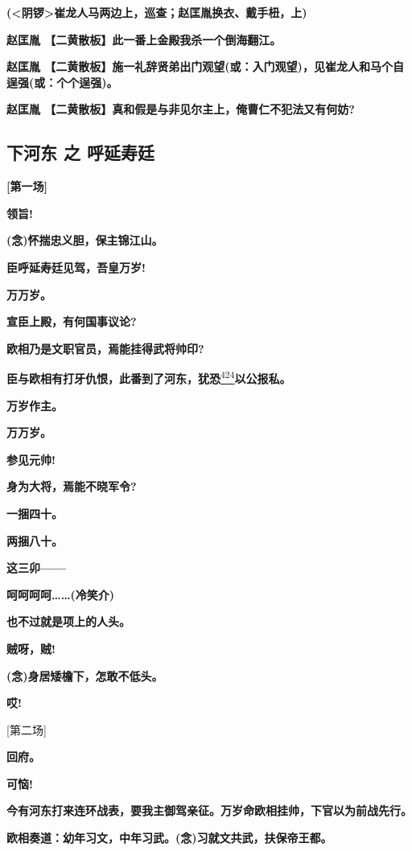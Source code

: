 \textbf{(\textless{}阴锣\textgreater{}崔龙人马两边上，巡查；赵匡胤换衣、戴手杻，上)}

\textbf{赵匡胤 【二黄散板】此一番上金殿我杀一个倒海翻江。}

\textbf{赵匡胤
【二黄散板】施一礼辞贤弟出门观望(或：入门观望)，见崔龙人和马个自逞强(或：个个逞强)。}

\textbf{赵匡胤 【二黄散板】真和假是与非见尔主上，俺曹仁不犯法又有何妨?}

\hypertarget{ux4e0bux6cb3ux4e1c-ux4e4b-ux547cux5ef6ux5bffux5ef7}{%
\subsection{下河东 之
呼延寿廷}\label{ux4e0bux6cb3ux4e1c-ux4e4b-ux547cux5ef6ux5bffux5ef7}}

\textbf{{[}第一场{]}}

\textbf{领旨!}

\textbf{(念)怀揣忠义胆，保主锦江山。}

\textbf{臣呼延寿廷见驾，吾皇万岁!}

\textbf{万万岁。}

\textbf{宣臣上殿，有何国事议论?}

\textbf{欧相乃是文职官员，焉能挂得武将帅印?}

\textbf{臣与欧相有打牙仇恨，此番到了河东，犹恐}\protect\hyperlink{fn424}{\textsuperscript{424}}\textbf{以公报私。}

\textbf{万岁作主。}

\textbf{万万岁。}

\textbf{参见元帅!}

\textbf{身为大将，焉能不晓军令?}

\textbf{一捆四十。}

\textbf{两捆八十。}

\textbf{这三卯------}

\textbf{呵呵呵呵\ldots{}\ldots{}(冷笑介)}

\textbf{也不过就是项上的人头。}

\textbf{贼呀，贼!}

\textbf{(念)身居矮檐下，怎敢不低头。}

\textbf{哎!}

{[}第二场{]}

\textbf{回府。}

\textbf{可恼!}

\textbf{今有河东打来连环战表，要我主御驾亲征。万岁命欧相挂帅，下官以为前战先行。}

\textbf{欧相奏道：幼年习文，中年习武。(念)习就文共武，扶保帝王都。}

